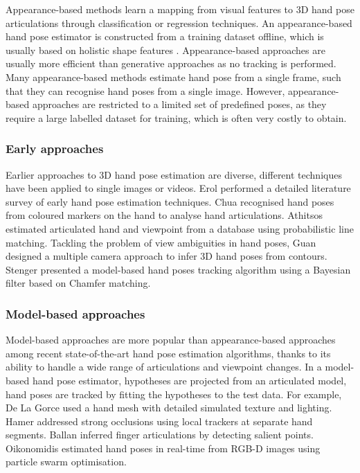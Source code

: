 Appearance-based methods learn a mapping from visual features to 3D hand pose articulations through classification or regression techniques. An appearance-based hand pose estimator is constructed from a training dataset offline, which is usually based on holistic shape features \cite{Rosales2001, Athitsos2003, Romero2009, Wang2009, Keskin2012}. Appearance-based approaches are usually more efficient than generative approaches as no tracking is performed. Many appearance-based methods estimate hand pose from a single frame, such that they can recognise hand poses from a single image. However, appearance-based approaches are restricted to a limited set of predefined poses, as they require a large labelled dataset for training, which is often very costly to obtain.  

\subsubsection{Early approaches} 
Earlier approaches to 3D hand pose estimation are diverse, different techniques have been applied to single images or videos. Erol \etal \cite{Erol2007} performed a detailed literature survey of early hand pose estimation techniques. Chua \etal \cite{Chua2002} recognised hand poses from coloured markers on the hand to analyse hand articulations. Athitsos \etal \cite{Athitsos2003} estimated articulated hand and viewpoint from a database using probabilistic line matching. Tackling the problem of view ambiguities in hand poses, Guan \etal \cite{Guan2006} designed a multiple camera approach to infer 3D hand poses from contours. Stenger \etal \cite{Stenger2006} presented a model-based hand poses tracking algorithm using a Bayesian filter based on Chamfer matching.  

\subsubsection{Model-based approaches} 
Model-based approaches are more popular than appearance-based approaches among recent state-of-the-art hand pose estimation algorithms, thanks to its ability to handle a wide range of articulations and viewpoint changes.   
In a model-based hand pose estimator, hypotheses are projected from an articulated model, hand poses are tracked by fitting the hypotheses to the test data. 
For example, De La Gorce \etal \cite{LaGorce2011} used a hand mesh with detailed simulated texture and lighting. 
Hamer \etal \cite{Hamer2009} addressed strong occlusions using local trackers at separate hand segments. 
Ballan \etal \cite{Ballan2012} inferred finger articulations by detecting salient points.  
Oikonomidis \etal \cite{Oikonomidis2011} estimated hand poses in real-time from RGB-D images using particle swarm optimisation. 

